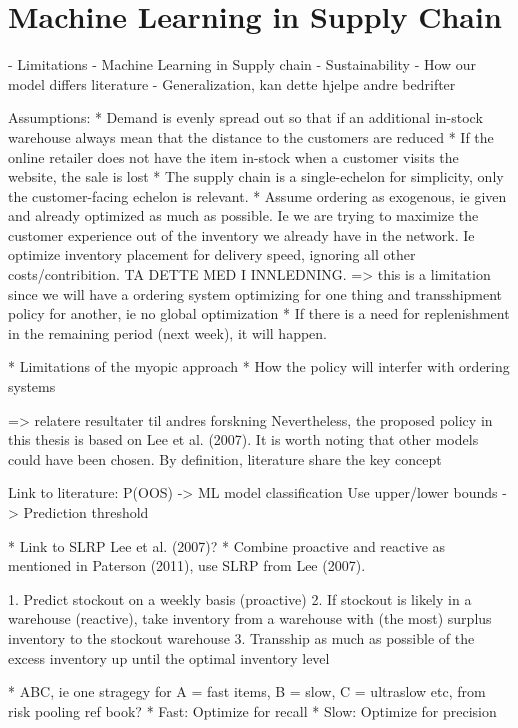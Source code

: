 \documentclass[../../main.tex]{subfiles}
\begin{document}

\section{Machine Learning in Supply Chain}


- Limitations
- Machine Learning in Supply chain
- Sustainability
- How our model differs literature
- Generalization, kan dette hjelpe andre bedrifter

Assumptions:
* Demand is evenly spread out so that if an additional in-stock warehouse always mean that the distance to the customers are reduced
* If the online retailer does not have the item in-stock when a customer visits the website, the sale is lost
* The supply chain is a single-echelon for simplicity, only the customer-facing echelon is relevant.
* Assume ordering as exogenous, ie given and already optimized as much as possible. Ie we are trying to maximize the customer experience out of the inventory we already have in the network. Ie optimize inventory placement for delivery speed, ignoring all other costs/contribition. TA DETTE MED I INNLEDNING.
=> this is a limitation since we will have a ordering system optimizing for one thing and transshipment policy for another, ie no global optimization
* If there is a need for replenishment in the remaining period (next week), it will happen.

* Limitations of the myopic approach
* How the policy will interfer with ordering systems

=> relatere resultater til andres forskning
Nevertheless, the proposed policy in this thesis is based on Lee et al. (2007). It is worth noting that other models could have been chosen. By definition, literature share the key concept


Link to literature:
P(OOS) -> ML model classification
Use upper/lower bounds -> Prediction threshold


* Link to SLRP Lee et al. (2007)?
  * Combine proactive and reactive as mentioned in Paterson (2011), use SLRP from Lee (2007).

1.	Predict stockout on a weekly basis (proactive)
2.	If stockout is likely in a warehouse (reactive), take inventory from a warehouse with (the most) surplus inventory to the stockout warehouse
3.	Transship as much as possible of the excess inventory up until the optimal inventory level

*	ABC, ie one stragegy for A = fast items, B = slow, C = ultraslow etc, from risk pooling ref book? 
  * Fast: Optimize for recall
  * Slow: Optimize for precision
\end{document}
